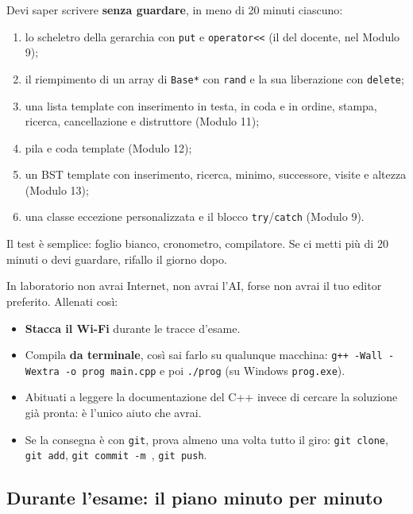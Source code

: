 \begin{passopasso}
Devi saper scrivere \textbf{senza guardare}, in meno di 20 minuti ciascuno:
\begin{enumerate}
  \item lo scheletro della gerarchia con \texttt{put} e \texttt{operator<<} (il
         del docente, nel Modulo 9);
  \item il riempimento di un array di \texttt{Base*} con \texttt{rand} e la sua
        liberazione con \texttt{delete};
  \item una lista template con inserimento in testa, in coda e in ordine, stampa,
        ricerca, cancellazione e distruttore (Modulo 11);
  \item pila e coda template (Modulo 12);
  \item un BST template con inserimento, ricerca, minimo, successore, visite e altezza
        (Modulo 13);
  \item una classe eccezione personalizzata e il blocco \texttt{try}/\texttt{catch}
        (Modulo 9).
\end{enumerate}
Il test è semplice: foglio bianco, cronometro, compilatore. Se ci metti più di 20 minuti
o devi guardare, rifallo il giorno dopo.
\end{passopasso}

\begin{consiglio}
In laboratorio non avrai Internet, non avrai l'AI, forse non avrai il tuo editor
preferito. Allenati così:
\begin{itemize}
  \item \textbf{Stacca il Wi-Fi} durante le tracce d'esame.
  \item Compila \textbf{da terminale}, così sai farlo su qualunque macchina:
        \texttt{g++ -Wall -Wextra -o prog main.cpp} e poi \texttt{./prog}
        (su Windows \texttt{prog.exe}).
  \item Abituati a leggere la documentazione del C++ invece di cercare la soluzione
        già pronta: è l'unico aiuto che avrai.
  \item Se la consegna è con \texttt{git}, prova almeno una volta tutto il giro:
        \texttt{git clone}, \texttt{git add}, \texttt{git commit -m },
        \texttt{git push}.
\end{itemize}
\end{consiglio}

\subsection*{Durante l'esame: il piano minuto per minuto}

